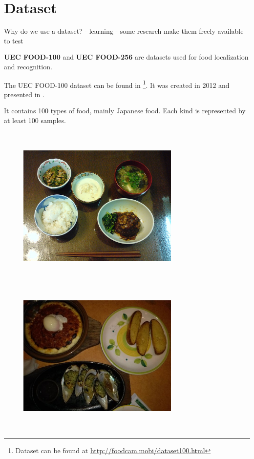 \chapter{Dataset}

Why do we use a dataset?
- learning
- some research make them freely available to test

\textbf{UEC FOOD-100} and \textbf{UEC FOOD-256} are datasets used for food localization and recognition.

The UEC FOOD-100 dataset can be found in \footnote{Dataset can be found at \url{http://foodcam.mobi/dataset100.html}}. It was created in 2012 and presented in \cite{Matsuda2012a}.

It contains 100 types of food, mainly Japanese food. Each kind is represented by at least 100 samples.

\begin{figure}[h]
    \includegraphics[width=8cm, height=8cm]{img/multiple_food_items_1}
    \includegraphics[width=8cm, height=8cm]{img/multiple_food_items_2}

\end{figure}
